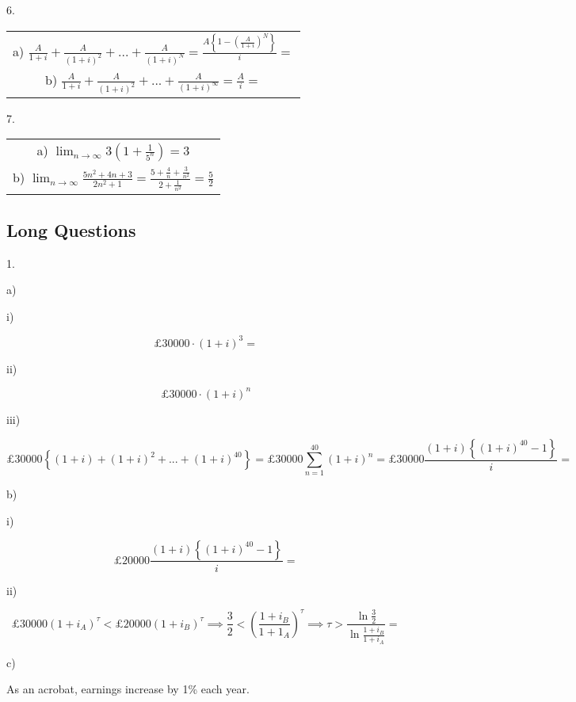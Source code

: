 \documentclass{article}
\begin{document}
6.

\begin{center}
  \begin{tabular}{c}
    a) $\frac{A}{1+i} + \frac{A}{(1+i)^2} + ... + \frac{A}{(1+i)^N} = \frac{A\left\{ 1-\left( \frac{A}{1+i} \right)^N \right\}}{i} = $ \\
    b) $\frac{A}{1+i} + \frac{A}{(1+i)^2}+...+\frac{A}{(1+i)^{\infty}} = \frac{A}{i} = $
  \end{tabular}
\end{center}

7.

\begin{center}
  \begin{tabular}{c}
    a) $\lim_{n\to\infty}3\left( 1+\frac{1}{5^n} \right) = 3$ \\
    b) $\lim_{n\to\infty} \frac{5n^2+4n+3}{2n^2+1} = \frac{5+\frac{4}{n}+\frac{3}{n^2}}{2+\frac{1}{n^2}} = \frac{5}{2}$
  \end{tabular}
\end{center}

\clearpage
\subsection{Long Questions}
\noindent

1.

a)

\quad\quad i)

$$
  \text{£}30000\cdot (1+i)^3 =
$$

\quad\quad ii)

$$
  \text{£}30000\cdot (1+i)^n
$$

\quad\quad iii)

$$
  \text{£}30000\left\{ (1+i) + (1+i)^2 +...+ (1+i)^{40} \right\} = \text{£}30000 \sum_{n=1}^{40}(1+i)^n = \text{£}30000\frac{(1+i)\left\{ (1+i)^{40}-1 \right\}}{i} =
$$

b)

\quad\quad i)

$$
  \text{£}20000\frac{(1+i)\left\{ (1+i)^{40}-1 \right\}}{i} =
$$

\quad\quad ii)

$$
  \text{£}30000(1+i_A)^{\tau} < \text{£}20000(1+i_B)^{\tau} \implies \frac{3}{2} < \left( \frac{1+i_B}{1+1_A} \right)^{\tau} \implies \tau > \frac{\ln{\frac{3}{2}}}{\ln{\frac{1+i_B}{1+i_A}}} =
$$

c)

As an acrobat, earnings increase by 1\% each year.
\end{document}
